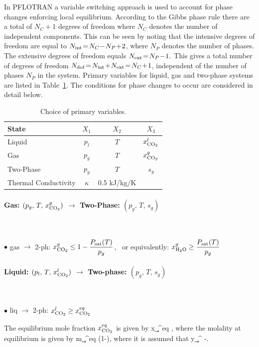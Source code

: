 In PFLOTRAN a variable switching approach is used to account for phase changes enforcing local equilibrium. According to the Gibbs phase rule there are a total of $N_C\!+\!1$ degrees of freedom where $N_C$ denotes the number of independent components. This can be seen by noting that the
intensive
degrees of freedom are equal to $N_{\rm int}\!=\!N_C \!-\! N_P \!+\!2$, where $N_P$ denotes the number of phases. The 
extensive
degrees of freedom equals $N_{\rm ext}\!=\!N_P\!-\!1.$ This gives a total number of degrees of freedom $N_{\rm dof}\!=\!N_{\rm int}\!+\!N_{\rm ext}\!=\!N_C\!+\!1$, independent of the number of phases $N_P$ in the system.
Primary variables for liquid, gas and two-phase systems are listed in Table~\ref{tvar}.
The conditions for phase changes to occur are considered in detail below.

\begin{table}\centering
\caption{Choice of primary variables.}\label{tvar}

\vspace{3mm}

\begin{tabular}{lccc}
\toprule
State & $X_1$ & $X_2$ & $X_3$\\
\midrule
Liquid & $p_l$ & $T$ & $x_{\rm CO_2}^l$\\
Gas & $p_g$ & $T$ & $x_{\rm CO_2}^g$\\
Two-Phase & $p_g$ & $T$ & $s_g$\\
Thermal Conductivity & $\kappa$ & 0.5 kJ/kg/K\\
\bottomrule
\end{tabular}
\end{table}


\paragraph{Gas: $(p_g,\,T,\,x_{\rm CO_2}^g)$ $\rightarrow$ Two-Phase: $(p_g,\,T,\,s_g^{})$} ~

$\bullet$ gas $\rightarrow$ 2-ph: $x_{\rm CO_2}^g \leq 1-\dfrac{P_{\rm sat}(T)}{p_g}$, \ or equivalently: $x_{\rm H_2O}^g \geq \dfrac{P_{\rm sat}(T)}{p_g}$

\paragraph{Liquid: $(p_l,\,T,\,x_{\rm CO_2}^l)$ $\rightarrow$ Two-phase: $(p_g,\,T,\,s_g^{})$} ~

$\bullet$ liq $\rightarrow$ 2-ph: $x_{\rm CO_2}^l \geq x_{\rm CO_2}^{eq}$

\noindent
The equilibrium mole fraction $x_{\rm CO_2}^{eq}$ is given by
\EQ
x_\c^{eq} \eq {},
\EN
where the molality at equilibrium is given by
\EQ
m_\c^{eq} \eq \left(1-\right),
\EN
where it is assumed that 
\EQ
y_\c^{} -.
\EN

